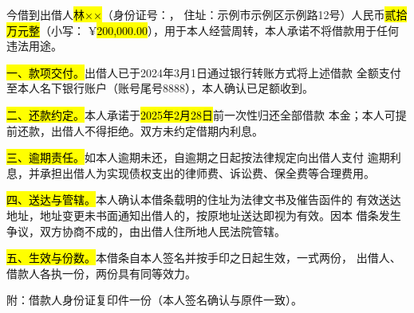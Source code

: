 \documentclass[zihao=-4]{ctexart}
\begin{document}

今借到出借人\hl{林××}（身份证号：，
住址：示例市示例区示例路12号）人民币\hl{贰拾万元整}（小写：
¥\hl{200,000.00}），用于本人经营周转，本人承诺不将借款用于任何违法用途。

\hl{一、款项交付。}出借人已于2024年3月1日通过银行转账方式将上述借款
全额支付至本人名下银行账户（账号尾号8888），本人确认已足额收到。

\hl{二、还款约定。}本人承诺于\hl{2025年2月28日}前一次性归还全部借款
本金；本人可提前还款，出借人不得拒绝。双方未约定借期内利息。

\hl{三、逾期责任。}如本人逾期未还，自逾期之日起按法律规定向出借人支付
逾期利息，并承担出借人为实现债权支出的律师费、诉讼费、保全费等合理费用。

\hl{四、送达与管辖。}本人确认本借条载明的住址为法律文书及催告函件的
有效送达地址，地址变更未书面通知出借人的，按原地址送达即视为有效。因本
借条发生争议，双方协商不成的，由出借人住所地人民法院管辖。

\hl{五、生效与份数。}本借条自本人签名并按手印之日起生效，一式两份，
出借人、借款人各执一份，两份具有同等效力。

\vspace{0.8\baselineskip}

\vspace{0.5\baselineskip}
{\noindent 附：借款人身份证复印件一份（本人签名确认与原件一致）。\par}
\end{document}
